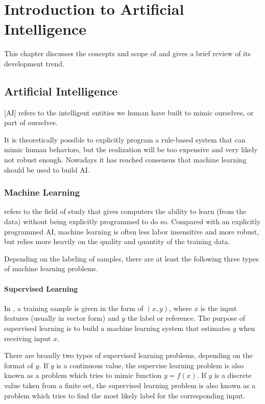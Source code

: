 \chapter{Introduction to Artificial Intelligence}

This chapter discusses the concepts and scope of  and gives a brief review of its development trend.

\section{Artificial Intelligence}

[AI] refers to the intelligent entities we human have built to mimic ourselves, or part of ourselves. 

It is theoretically possible to explicitly program a rule-based system that can mimic human behaviors, but the realization will be too expensive and very likely not robust enough. Nowadays it has reached consensus that machine learning should be used to build AI.

\subsection{Machine Learning}

 refers to the field of study that gives computers the ability to learn (from the data) without being explicitly programmed to do so. Compared with an explicitly programmed AI, machine learning is often less labor insensitive and more robust, but relies more heavily on the quality and quantity of the training data.

Depending on the labeling of samples, there are at least the following three types of machine learning problems.

\subsubsection*{Supervised Learning}

In , a training sample is given in the form of $(x,y)$, where $x$ is the input features (usually in vector form) and $y$ the label or reference. The purpose of supervised learning is to build a machine learning system that estimates $y$ when receiving input $x$.

There are broadly two types of supervised learning problems, depending on the format of $y$. If $y$ is a continuous value, the supervise learning problem is also known as a  problem which tries to mimic function $y = f(x)$. If $y$ is a discrete value taken from a finite set, the supervised learning problem is also known as a  problem which tries to find the most likely label for the corresponding input. 

